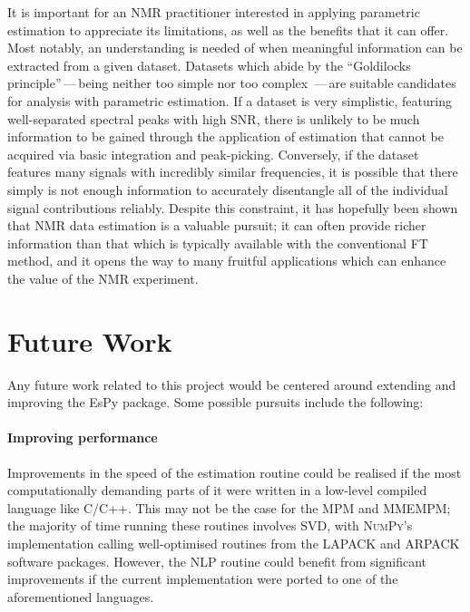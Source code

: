 It is important for an \ac{NMR} practitioner interested in applying
parametric estimation to appreciate its limitations, as well as the
benefits that it can offer. Most notably, an understanding is needed of when
meaningful information can be extracted from a given dataset.
Datasets which abide by the ``Goldilocks principle''\,---\,being neither too
simple nor too complex \,---\,are suitable candidates for analysis with
parametric estimation.
If a dataset is very simplistic, featuring well-separated
spectral peaks with high \ac{SNR}, there is unlikely to be much information
to be gained through the application of estimation that cannot be acquired via
basic integration and peak-picking.
Conversely, if the dataset features many signals with incredibly similar
frequencies, it is possible that there simply is not enough
information to accurately disentangle all of the individual signal
contributions reliably.
Despite this constraint, it has hopefully been shown that \ac{NMR} data
estimation is a valuable pursuit; it can often provide richer information than
that which is typically available with the conventional \ac{FT} method, and it
opens the way to many fruitful applications which can enhance the value of the
\ac{NMR} experiment.

\section{Future Work}
\label{sec:future-work}
Any future work related to this project would be centered around extending and
improving the \ac{EsPy} package. Some possible pursuits include the following:

\paragraph{Improving performance}
Improvements in the speed of the estimation routine
could be realised if the most computationally demanding parts of it were
written in a low-level compiled language like C/C++. This may not
be the case for the \ac{MPM} and \ac{MMEMPM}; the majority of time running
these routines involves \ac{SVD}, with \textsc{NumPy}'s implementation calling
well-optimised routines from the \textsc{LAPACK} and \textsc{ARPACK} software
packages. However, the \ac{NLP} routine could
benefit from significant improvements if the current \Python implementation
were ported to one of the aforementioned languages.

